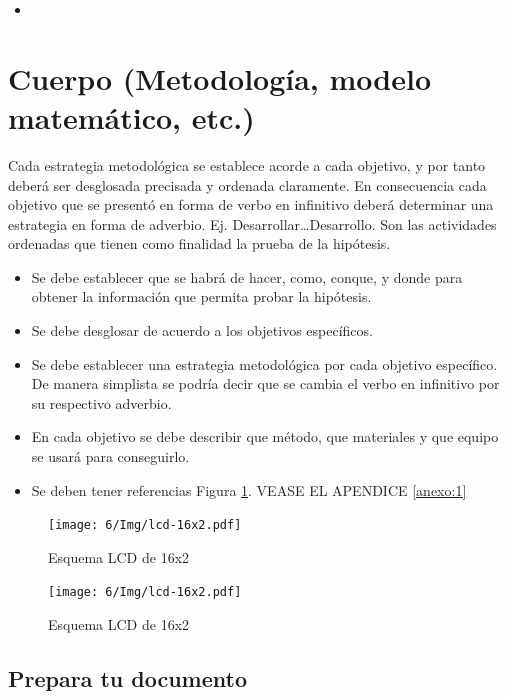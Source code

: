     \begin{itemize}
        \item 
    \end{itemize}
    
    \section{Cuerpo (Metodología, modelo matemático, etc.)}
    
    Cada estrategia metodológica se establece acorde a cada objetivo, y por tanto deberá ser desglosada precisada y ordenada claramente. En consecuencia cada objetivo que se presentó en forma de verbo en infinitivo deberá determinar una estrategia en forma de adverbio. Ej. Desarrollar…Desarrollo. Son las actividades ordenadas que tienen como finalidad la prueba de la hipótesis. 
    
    \begin{itemize}
        \item Se debe establecer que se habrá de hacer, como, conque, y donde para obtener la información que permita probar la hipótesis.  
        \item Se debe desglosar de acuerdo a los objetivos específicos. 
        \item Se debe establecer una estrategia metodológica por cada objetivo específico. De manera simplista se podría decir que se cambia el verbo en infinitivo por su respectivo adverbio.
        \item En cada objetivo se debe describir que método, que materiales y que equipo se usará para conseguirlo.
        \item Se deben tener referencias Figura \ref{fig:lcd-16x2-1}.
        VEASE EL APENDICE \ref{anexo:1}
    \end{itemize}
    \begin{figure}[H]
        \centering
        \texttt{[image: 6/Img/lcd-16x2.pdf]}
        \caption{Esquema LCD de 16x2}
        \label{fig:lcd-16x2-1}
    \end{figure}
    \begin{figure}[H]
        \centering
        \texttt{[image: 6/Img/lcd-16x2.pdf]}
        \caption{Esquema LCD de 16x2}
        \label{fig:lcd-16x2-2}
    \end{figure}
    \subsection{Prepara tu documento}
    
